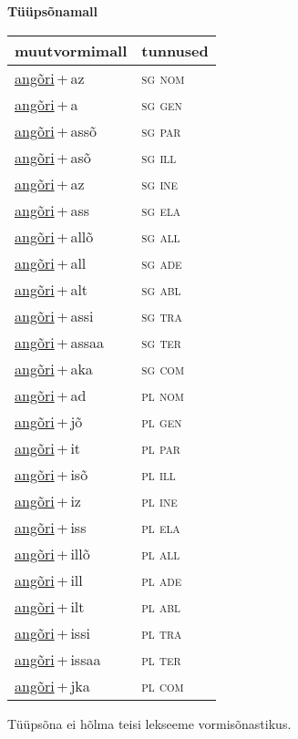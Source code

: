 
\vspace{1.8em}
\begin{minipage}{\textwidth}
\textbf{Tüüpsõnamall \,}\\

\begin{sideways}
\begin{tabular}{l l}
muutvormimall & tunnused \\
\hline
\underline{angõri}\,+\,az & \textsc{ sg nom } \\
\underline{angõri}\,+\,a & \textsc{ sg gen } \\
\underline{angõri}\,+\,assõ & \textsc{ sg par } \\
\underline{angõri}\,+\,asõ & \textsc{ sg ill } \\
\underline{angõri}\,+\,az & \textsc{ sg ine } \\
\underline{angõri}\,+\,ass & \textsc{ sg ela } \\
\underline{angõri}\,+\,allõ & \textsc{ sg all } \\
\underline{angõri}\,+\,all & \textsc{ sg ade } \\
\underline{angõri}\,+\,alt & \textsc{ sg abl } \\
\underline{angõri}\,+\,assi & \textsc{ sg tra } \\
\underline{angõri}\,+\,assaa & \textsc{ sg ter } \\
\underline{angõri}\,+\,aka & \textsc{ sg com } \\
\underline{angõri}\,+\,ad & \textsc{ pl nom } \\
\underline{angõri}\,+\,jõ & \textsc{ pl gen } \\
\underline{angõri}\,+\,it & \textsc{ pl par } \\
\underline{angõri}\,+\,isõ & \textsc{ pl ill } \\
\underline{angõri}\,+\,iz & \textsc{ pl ine } \\
\underline{angõri}\,+\,iss & \textsc{ pl ela } \\
\underline{angõri}\,+\,illõ & \textsc{ pl all } \\
\underline{angõri}\,+\,ill & \textsc{ pl ade } \\
\underline{angõri}\,+\,ilt & \textsc{ pl abl } \\
\underline{angõri}\,+\,issi & \textsc{ pl tra } \\
\underline{angõri}\,+\,issaa & \textsc{ pl ter } \\
\underline{angõri}\,+\,jka & \textsc{ pl com } \\
\end{tabular}
\end{sideways}
\label{tab:tüüpsõnamall-angõriaz}

\end{minipage}

 
\vspace{1em}
\noindent Tüüpsõna ei hõlma teisi lekseeme vormi\-sõnastikus.
